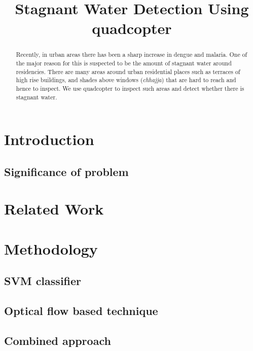 \documentclass[times,10pt,twocolumn,a4paper]{article}
\title{Stagnant Water Detection Using quadcopter}
\author{}
\begin{document}
\maketitle

\begin{abstract}
Recently, in urban areas there has been a sharp increase in dengue and malaria.
One of the major reason for this is suspected to be the amount of stagnant
water around residencies. There are many areas around urban residential places
such as terraces of high rise buildings, and shades above windows
(\emph{chhajja}) that are hard to reach and hence to inspect. We use quadcopter
to inspect such areas and detect whether there is stagnant water.

\end{abstract}

\section{Introduction}

\subsection{Significance of problem}
\cite{WHO15Malaria} \cite{Cecilia14} \cite{WHO15Dengue} \cite{Microsoft15}

\section{Related Work}

\cite{rankin11}\cite{santana12}\cite{zhang10}

\section{Methodology}

\subsection{SVM classifier}
\cite{Chapelle99}

\subsection{Optical flow based technique}
\cite{Liu11Thesis}

\cite{Liu11} 
\subsection{Combined approach}
\end{document}
